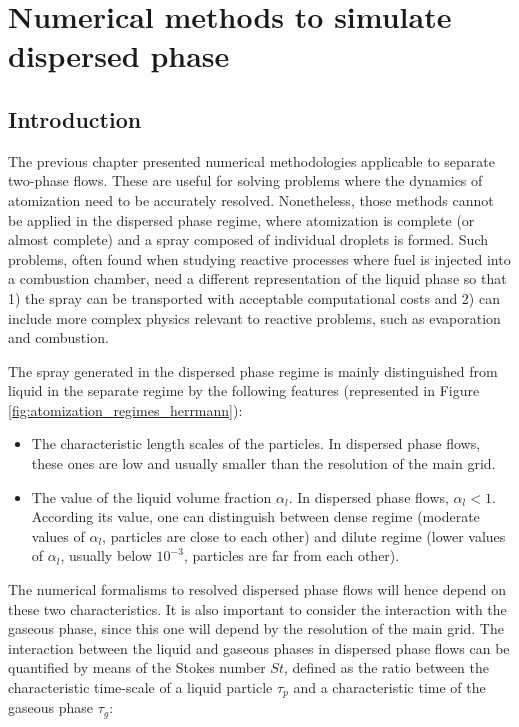 \chapter{Numerical methods to simulate dispersed phase}
\label{ch3:disperse_phase_methods}

\section{Introduction}

The previous chapter presented numerical methodologies applicable to separate two-phase flows. These are useful for solving problems where the dynamics of atomization need to be accurately resolved. Nonetheless, those methods cannot be applied in the dispersed phase regime, where atomization is complete (or almost complete) and a spray composed of individual droplets is formed. Such problems, often found when studying reactive processes where fuel is injected into a combustion chamber, need a different representation of the liquid phase so that 1) the spray can be transported with acceptable computational costs and 2) can include more complex physics relevant to reactive problems, such as evaporation and combustion.

The spray generated in the dispersed phase regime is mainly distinguished from liquid in the separate regime by the following features (represented in Figure \ref{fig:atomization_regimes_herrmann}):

\begin{itemize}

	\item The characteristic length scales of the particles. In dispersed phase flows, these ones are low and usually smaller than the resolution of the main grid.
	
	\item The value of the liquid volume fraction $\alpha_l$. In dispersed phase flows, $\alpha_l < 1$. According its value, one can distinguish between dense regime (moderate values of $\alpha_l$, particles are close to each other) and dilute regime (lower values of $\alpha_l$, usually below $10^{-3}$, particles are far from each other).

\end{itemize}

The numerical formalisms to resolved dispersed phase flows will hence depend on these two characteristics. It is also important to consider the interaction with the gaseous phase, since this one will depend by the resolution of the main grid. The interaction between the liquid and gaseous phases in dispersed phase flows can be quantified by means of the Stokes number $St$, defined as the ratio between the characteristic time-scale of a liquid particle $\tau_p$ and a characteristic time of the gaseous phase $\tau_g$: 

